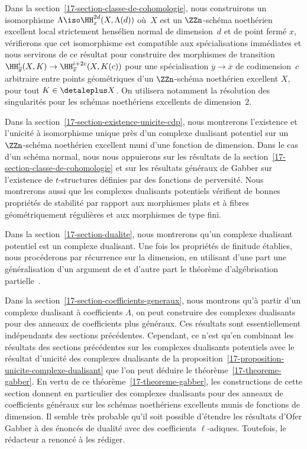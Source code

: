 \documentclass[10pt]{../fichiers-configuration-latex/smfart}
\begin{document}
Dans la section~\ref{17-section-classe-de-cohomologie}, nous construirons un
isomorphisme $\Lambda\iso \HH^{2d}_x(X,\Lambda(d))$ où $X$ est un 
$\ZZn$-schéma noethérien
excellent local strictement hensélien normal de dimension $d$ et de
point fermé $x$, vérifierons que cet isomorphisme est compatible aux
spécialisations immédiates et nous servirons de ce résultat pour
construire des morphismes de transition $\HH^{i}_{\overline y}(X,K)\to
\HH^{i+2c}_{\overline x}(X,K(c))$ pour une spécialisation $\overline
y\to\overline x$ de codimension $c$ arbitraire entre points géométriques d'un
$\ZZn$-schéma noethérien excellent $X$, pour tout
$K\in\detaleplus X$. On utilisera
notamment la résolution des singularités pour les schémas noethériens
excellents de dimension $2$.

Dans la section~\ref{17-section-existence-unicite-cdp}, nous montrerons
l'existence et l'unicité à isomorphisme unique près d'un complexe dualisant
potentiel sur un $\ZZn$-schéma noethérien excellent muni d'une fonction de
dimension. Dans le cas d'un schéma normal, nous nous appuierons sur les
résultats de la section~\ref{17-section-classe-de-cohomologie} et sur les
résultats généraux de Gabber sur l'existence de $t$-structures définies par
des fonctions de perversité. Nous montrerons aussi que les complexes
dualisants potentiels vérifient de bonnes propriétés de stabilité par
rapport aux morphismes plats et à fibres géométriquement régulières et aux
morphismes de type fini.

Dans la section~\ref{17-section-dualite}, nous montrerons qu'un
complexe dualisant potentiel est un complexe dualisant. Une fois les
propriétés de finitude établies, nous procéderons par récurrence sur la
dimension, en utilisant d'une part une généralisation d'un argument de
 et d'autre part le théorème
d'algébrisation partielle~.

Dans la section~\ref{17-section-coefficients-generaux}, nous montrons qu'à
partir d'un complexe dualisant à coefficients $\Lambda$, on peut construire
des complexes dualisants pour des anneaux de coefficients plus généraux.
Ces résultats sont essentiellement indépendants des sections précédentes.
Cependant, ce n'est qu'en combinant les résultats des sections précédentes
sur les complexes dualisants potentiels avec le résultat d'unicité des
complexes dualisants de la
proposition~\ref{17-proposition-unicite-complexe-dualisant} que l'on peut
déduire le théorème~\ref{17-theoreme-gabber}. En vertu de ce
théorème~\ref{17-theoreme-gabber}, les constructions de cette section donnent
en particulier des complexes dualisants pour des anneaux de coefficients
généraux sur les schémas noethériens excellents munis de fonctions de
dimension. Il semble très probable qu'il soit possible d'étendre les
résultats d'Ofer Gabber à des énoncés de dualité avec des coefficients
$\ell$-adiques. Toutefois, le rédacteur a renoncé à les rédiger.
\end{document}
